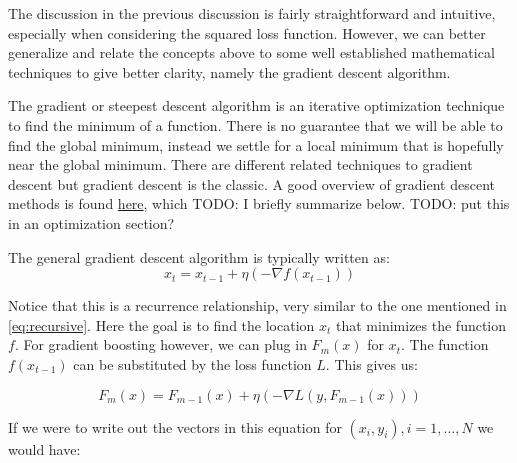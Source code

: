 \documentclass[paper=a4, fontsize=11pt]{scrartcl} %
\numberwithin{equation}{section} %
\numberwithin{figure}{section} %
\numberwithin{table}{section} %
\begin{document}
The discussion in the previous discussion is fairly straightforward and intuitive, especially when considering the squared loss function. However, we can better generalize and relate the concepts above to some well established mathematical techniques to give better clarity, namely the gradient descent algorithm. 

The gradient or steepest descent algorithm is an iterative optimization technique to find the minimum of a function. There is no guarantee that we will be able to find the global minimum, instead we settle for a local minimum that is hopefully near the global minimum. There are different related techniques to gradient descent but gradient descent is the classic. A good overview of gradient descent methods is found \href{http://www.acme.byu.edu/wp-content/uploads/2018/02/GradientMethods.pdf}{here}, which TODO: I briefly summarize below. TODO: put this in an optimization section?

The general gradient descent algorithm is typically written as:
\begin{equation}
x_t = x_{t-1} + \eta \left( -\nabla f(x_{t-1}) \right)
\end{equation}

Notice that this is a recurrence relationship, very similar to the one mentioned in \ref{eq:recursive}. Here the goal is to find the location $x_t$ that minimizes the function $f$. For gradient boosting however, we can plug in $F_m(x)$ for $x_t$. The function $f(x_{t-1})$ can be substituted by the loss function $L$. This gives us:

\begin{equation}
F_m(x) = F_{m-1}(x) + \eta \left (-\nabla L(y, F_{m-1}(x)) \right)
\end{equation}

If we were to write out the vectors in this equation for $(x_i, y_i), i=1,...,N$ we would have:
\end{document}
